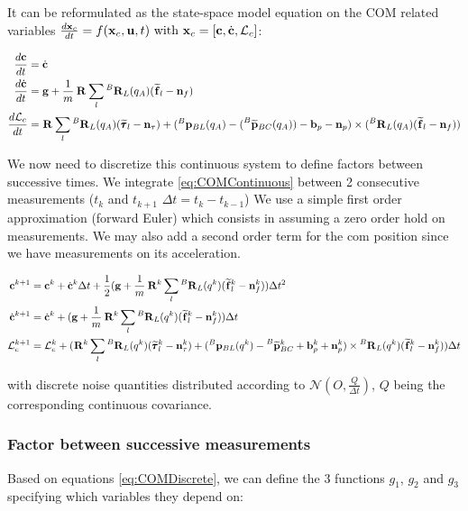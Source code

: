 \documentclass[11pt]{article}
\newcommand{\Rot}[2]{\prescript{#1}{}{\bfR}_{#2}}
\newcommand{\noise}{\bfn}
\newcommand{\bias}{\bfb}
\newcommand{\posi}[2]{\prescript{#1}{}{\bfp}_{#2}}
\newcommand{\posim}[2]{\prescript{#1}{}{\widetilde{\bfp}}_{#2}}
\newcommand{\forcem}[2]{\prescript{#1}{}{\widetilde{\bff}}_{#2}}
\newcommand{\torquem}[2]{\prescript{#1}{}{\widetilde{\pmb{\tau}}}_{#2}}
\newcommand{\AM}{\mathcal{L}}
\newcommand{\COM}{\bfc}
\newcommand{\COMd}{\dot{\bfc}}
\begin{document}
It can be reformulated as the state-space model equation on the COM related variables \( \frac{d\bfx_c}{dt}= f(\bfx_c, \bfu, t)$ with $\bfx_c = [\COM, \COMd, \AM_c]\):

\begin{equation}
\begin{split}
\frac{d\COM}{dt} &= \COMd 
\\
\frac{d\dot{\bfc}}{dt}&= \bfg + \frac{1}{m} \Rot{}{} \sum_l \Rot{B}{L}(q_A) (\forcem{}{l} - \noise_f) 
\\
\frac{d\AM_c}{dt}&= \Rot{}{} \sum_l \Rot{B}{L}(q_A)(\torquem{}{l} - \noise_{\tau}) + (\posi{B}{BL}(q_A) - (\posim{B}{BC}(q_A)) -  \bias_{p} - \noise_p) \times (\Rot{B}{L}(q_A)(\forcem{}{l} - \noise_f))
\end{split}
\label{eq:COMContinuous}
\end{equation}


We now need to discretize this continuous system to define factors between successive times. We integrate \ref{eq:COMContinuous} between 2 consecutive measurements ($t_k$ and $t_{k+1}$ $\Delta t = t_{k} - t_{k-1}$)  We use a simple first order approximation (forward Euler) which consists in assuming a zero order hold on measurements. We may also add a second order term for the com position since we have measurements on its acceleration.

\begin{equation}
\begin{split}
\COM^{k+1} &= \COM^{k} + \COMd^{k} \Delta t 
+ \dfrac{1}{2}(\bfg + \frac{1}{m} \Rot{}{}^{k} \sum_l \Rot{B}{L}(q^{k}) (\forcem{}{l}^{k} - \noise_f^{k})) \Delta t^2
\\
\COMd^{k+1}&= \COMd^{k} + (\bfg + \frac{1}{m} \Rot{}{}^{k} \sum_l \Rot{B}{L}(q^{k}) (\forcem{}{l}^{k} - \noise_f^{k})) \Delta t 
\\
\AM_c^{k+1} &= \AM_c^{k} +  ( 
\Rot{}{}^{k}\sum_l \Rot{B}{L}(q^{k})(\torquem{}{l}^{k} - \noise_{\tau}^{k}) + (\posi{B}{BL}(q^k) - \posim{B}{BC}^k + \bias_{p}^k + \noise_p^k) \times \Rot{B}{L}(q^{k})(\forcem{}{l}^{k} - \noise_f^{k}) 
) \Delta t
\end{split}
\label{eq:COMDiscrete}
\end{equation}

with discrete noise quantities distributed according to \( \mathcal{N}(O,\frac{Q}{\Delta t}) \), \(Q\) being the corresponding continuous covariance.


\subsubsection{Factor between successive measurements}
Based on equations \ref{eq:COMDiscrete}, we can define the 3 functions \(g_1\), \(g_2\) and \(g_3\) specifying which variables they depend on:
\end{document}
